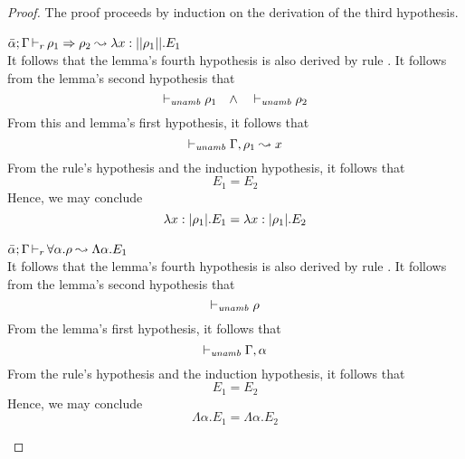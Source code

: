 \begin{proof}
The proof proceeds by induction on the derivation of the third hypothesis.
\begin{description}
\setlength{\itemsep}{1em}
\item[\fbox{\texttt{(R-IAbs)}}]\quad$\bar{\alpha};\Gamma \mathop{\vdash_{r}} \rho_1 \Rightarrow \rho_2 \leadsto \lambda x:||\rho_1||.E_1$ \ \\

It follows that the lemma's fourth hypothesis is also derived by rule
. It follows from the lemma's second hypothesis that 
\begin{equation*}
  \vdash_{\mathit{unamb}} \rho_1 \quad\wedge\quad \vdash_{\mathit{unamb}} \rho_2
\end{equation*}
From this and lemma's first hypothesis, it follows that
\begin{equation*}
  \vdash_{\mathit{unamb}} \Gamma,\rho_1 \leadsto x
\end{equation*}
From the rule's hypothesis and the induction hypothesis, it follows that
\begin{equation*}
  E_1 = E_2
\end{equation*}
Hence, we may conclude
\begin{equation*}
  \lambda x:|\rho_1|.E_1 = \lambda x:|\rho_1|.E_2
\end{equation*}

\item[\fbox{\texttt{(R-TAbs)}}]\quad$\bar{\alpha};\Gamma \mathop{\vdash_{r}} \forall \alpha. \rho \leadsto \Lambda\alpha.E_1$ \ \\

It follows that the lemma's fourth hypothesis is also derived by rule
. It follows from the lemma's second hypothesis that 
\begin{equation*}
  \vdash_{\mathit{unamb}} \rho
\end{equation*}
From the lemma's first hypothesis, it follows that
\begin{equation*}
  \vdash_{\mathit{unamb}} \Gamma, \alpha
\end{equation*}
From the rule's hypothesis and the induction hypothesis, it follows that
\begin{equation*}
  E_1 = E_2
\end{equation*}
Hence, we may conclude
\begin{equation*}
  \Lambda \alpha.E_1 = \Lambda \alpha.E_2
\end{equation*}


\end{description}
\end{proof}

